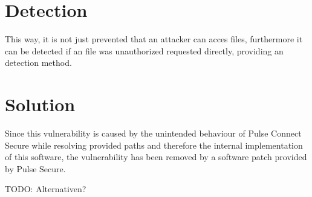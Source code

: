 \section{Detection}
\label{detection}

This way, it is not just prevented that an attacker can acces files, furthermore it can be detected if an file was unauthorized requested directly, providing an detection method.

\section{Solution}
\label{solution}
Since this vulnerability is caused by the unintended behaviour of Pulse Connect Secure while resolving provided paths and therefore the internal implementation of this software, the vulnerability has been removed by a software patch provided by Pulse Secure.

TODO: Alternativen?
